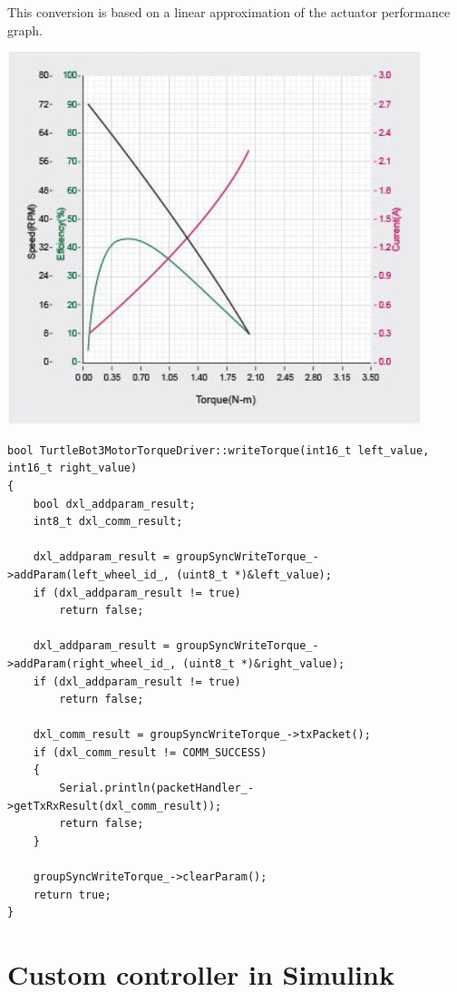 \documentclass[12]{article}
\begin{document}
This conversion is based on a linear approximation of the actuator performance graph.

\begin{center}
	\includegraphics[width=\linewidth]{images/xm430_performance.png}\\
\end{center}

\begin{lstlisting}
bool TurtleBot3MotorTorqueDriver::writeTorque(int16_t left_value, int16_t right_value)
{
    bool dxl_addparam_result;
    int8_t dxl_comm_result;

    dxl_addparam_result = groupSyncWriteTorque_->addParam(left_wheel_id_, (uint8_t *)&left_value);
    if (dxl_addparam_result != true)
        return false;

    dxl_addparam_result = groupSyncWriteTorque_->addParam(right_wheel_id_, (uint8_t *)&right_value);
    if (dxl_addparam_result != true)
        return false;

    dxl_comm_result = groupSyncWriteTorque_->txPacket();
    if (dxl_comm_result != COMM_SUCCESS)
    {
        Serial.println(packetHandler_->getTxRxResult(dxl_comm_result));
        return false;
    }

    groupSyncWriteTorque_->clearParam();
    return true;
}
\end{lstlisting}

\newpage

\section{Custom controller in Simulink}
\end{document}
